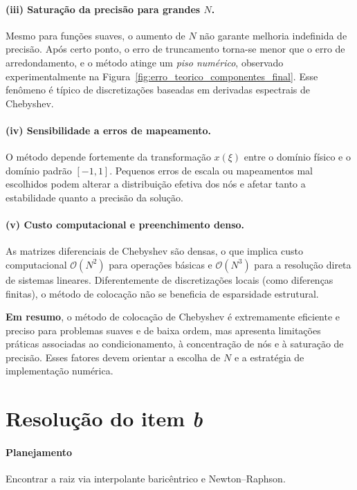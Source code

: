 \documentclass[11pt,a4paper]{article}
\begin{document}
\paragraph{(iii) Saturação da precisão para grandes $N$.}
Mesmo para funções suaves, o aumento de $N$ não garante melhoria indefinida de precisão.  
Após certo ponto, o erro de truncamento torna-se menor que o erro de arredondamento, e o método atinge um \emph{piso numérico}, observado experimentalmente na Figura~\ref{fig:erro_teorico_componentes_final}.  
Esse fenômeno é típico de discretizações baseadas em derivadas espectrais de Chebyshev.

\paragraph{(iv) Sensibilidade a erros de mapeamento.}
O método depende fortemente da transformação $x(\xi)$ entre o domínio físico e o domínio padrão $[-1,1]$.  
Pequenos erros de escala ou mapeamentos mal escolhidos podem alterar a distribuição efetiva dos nós e afetar tanto a estabilidade quanto a precisão da solução.

\paragraph{(v) Custo computacional e preenchimento denso.}
As matrizes diferenciais de Chebyshev são densas, o que implica custo computacional $\mathcal{O}(N^2)$ para operações básicas e $\mathcal{O}(N^3)$ para a resolução direta de sistemas lineares.  
Diferentemente de discretizações locais (como diferenças finitas), o método de colocação não se beneficia de esparsidade estrutural.

\medskip
\noindent
\textbf{Em resumo}, o método de colocação de Chebyshev é extremamente eficiente e preciso para problemas suaves e de baixa ordem, mas apresenta limitações práticas associadas ao condicionamento, à concentração de nós e à saturação de precisão.  
Esses fatores devem orientar a escolha de $N$ e a estratégia de implementação numérica.

\section{Resolução do item \textit{b}}

\paragraph{Planejamento} Encontrar a raiz via interpolante baricêntrico e Newton--Raphson.
\end{document}
